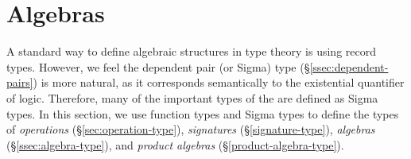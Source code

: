 \documentclass[a4paper,UKenglish,cleveref,autoref,thm-restate,11pt]{lipics-v2021}
\begin{document}
\section{Algebras}\label{sec:types-for-algebras}
A standard way to define algebraic structures in type theory is using record types.  However, we feel the dependent pair (or Sigma) type (\S\ref{ssec:dependent-pairs}) is more natural, as it corresponds semantically to the existential quantifier of logic. Therefore, many of the important types of the \ualib are defined as Sigma types. In this section, we use function types and Sigma types to define the types of \emph{operations} (\S\ref{sec:operation-type}), \emph{signatures} (\S\ref{signature-type}), \emph{algebras} (\S\ref{ssec:algebra-type}), and \emph{product algebras} (\S\ref{product-algebra-type}).
\end{document}
